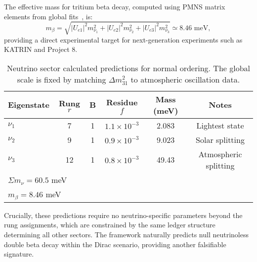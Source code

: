 \documentclass[%
amsmath,amssymb,
aps,
prb,
floatfix, showkeys, 10pt,
]{revtex4-2}
\begin{document}
The effective mass for tritium beta decay, computed using PMNS matrix elements from global fits~\cite{NuFIT52}, is:
\begin{equation}
m_\beta = \sqrt{|U_{e1}|^2 m_{\nu_1}^2 + |U_{e2}|^2 m_{\nu_2}^2 + |U_{e3}|^2 m_{\nu_3}^2} \simeq 8.46 \text{ meV},
\label{eq:beta_decay_mass}
\end{equation}
providing a direct experimental target for next-generation experiments such as KATRIN and Project 8.
\begin{table}[ht]
\centering
\caption{Neutrino sector calculated predictions for normal ordering.
  The global scale is fixed by matching $\Delta m_{31}^2$ to atmospheric oscillation data.}
\label{tab:neutrinos}
\begin{tabular}{lccccc}
\hline\hline
Eigenstate & Rung $r$ & B & Residue $f$ & Mass (meV) & Notes \\
\hline
$\nu_1$   & 7 & 1    &  $1.1 \times 10^{-3}$ & 2.083 & Lightest state \\
$\nu_2$   & 9 &  1   &  $0.9 \times 10^{-3}$ & 9.023 & Solar splitting \\
$\nu_3$   & 12&   1  &  $0.8 \times 10^{-3}$ & 49.43 & Atmospheric splitting \\
\hline
\multicolumn{4}{l}{$\Sigma m_\nu = 60.5$ meV} \\
\multicolumn{4}{l}{$m_\beta = 8.46$ meV} \\
\hline\hline
\end{tabular}
\end{table}
Crucially, these predictions require no neutrino-specific parameters beyond the rung assignments, which are constrained by the same ledger structure determining all other sectors. The framework naturally predicts null neutrinoless double beta decay within the Dirac scenario, providing another falsifiable signature.
\end{document}
